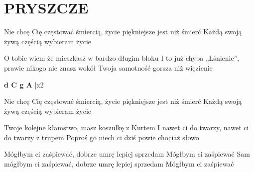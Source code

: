 \documentclass[../../../songbook.tex]{subfiles}
\begin{document}
\TabPositions{9cm} %
\section*{PRYSZCZE}
{}
\vspace{0.5cm}
{\footnotesize
Nie chcę Cię częstować śmiercią, życie piękniejsze jest niż śmierć	 \newline  
Każdą swoją żywą częścią wybieram życie								 \newline
			
O tobie wiem że mieszkasz w bardzo długim bloku 		     \newline        
I to już chyba „Lśnienie”, prawie nikogo nie znasz wokół	 \newline
Twoja samotność gorsza niż więzienie						 \newline

{\color{red}\textbf{d C g A} } |x2 \newline
       
Nie chcę Cię częstować śmiercią, życie piękniejsze jest niż śmierć	 \newline  
Każdą swoją żywą częścią wybieram życie								 \newline   
			 
Twoje kolejne kłamstwo, masz koszulkę z Kurtem			 \newline					
I nawet ci do twarzy, nawet ci do twarzy z trupem		 \newline
Poproś go niech ci dziś powie chociaż słowo				 \newline

Mógłbym ci zaśpiewać, dobrze umrę lepiej sprzedam		 \newline
Mógłbym ci zaśpiewać									 \newline
Sam mógłbym ci zaśpiewać, dobrze umrę lepiej sprzedam	 \newline
Mógłbym ci zaśpiewać									 \newline
    
}
\end{document}
